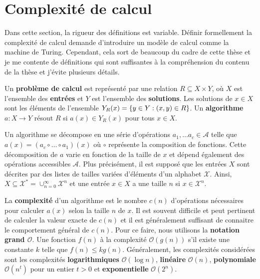 \begin{comment}
\end{comment}

\appendix

\chapter{Complexité de calcul}
\label{chap:complexite_calcul}

Dans cette section,
la rigueur des définitions est variable.
Définir formellement la complexité de calcul demande d'introduire un modèle de 
calcul comme la machine de Turing.
Cependant,
cela sort de beaucoup du cadre de cette thèse
et je me contente de définitions qui sont suffisantes à la compréhension du contenu de la thèse
et j'évite plusieurs détails.

Un \textbf{problème de calcul} est représenté par une relation $R \subseteq X \times Y$, 
où $X$ est l'ensemble des \textbf{entrées} et $Y$ est l'ensemble des \textbf{solutions}.
Les solutions de $x \in X$ sont les éléments de l'ensemble $Y_R(x) = \qty{y \in Y : (x, y)\in R}$.
Un \textbf{algorithme} $a: X \to Y$ résout $R$ si $a(x) \in Y_R(x)$ pour tous $x \in X$.

Un algorithme se décompose en une série d'opérations $a_1, \ldots a_c \in \mathcal A$ telle
que $a(x) = (a_c \circ \ldots \circ a_1)(x)$ où $\circ$ représente la composition
de fonctions.
Cette décomposition de $a$ varie en fonction de la taille de $x$
et dépend également des opérations accessibles $\mathcal A$.
Plus précisément,
il est supposé que les entrées $X$ sont décrites par des listes de tailles variées
d'éléments d'un alphabet $\mathcal X$.
Ainsi,
$X \subseteq \mathcal X^* = \cup_{n=0}^\infty \mathcal X^n$ et
une entrée $x \in X$ a une taille $n$ si $x \in \mathcal X^n$.

La \textbf{complexité} d'un algorithme est le nombre $c(n)$ d'opérations nécessaires
pour calculer $a(x)$ selon la taille $n$ de $x$.
Il est souvent difficile et peut pertinent de calculer la valeur exacte de $c(n)$
et il est généralement suffisant de connaitre le comportement général de $c(n)$.
Pour ce faire,
nous utilisons la \textbf{notation grand $\mathcal O$}.
Une fonction $f(n)$ à la complexité $\mathcal O(g(n))$ s'il existe
une constante $k$ telle que $f(n) \leq k g(n)$.
Généralement,
les complexités considérées sont les complexités \textbf{logarithmiques} $\mathcal O(\log n)$,
\textbf{linéaire} $\mathcal O(n)$,
\textbf{polynomiale} $\mathcal O(n^t)$ pour un entier $t > 0$
et \textbf{exponentielle} $\mathcal O(2^n)$.

